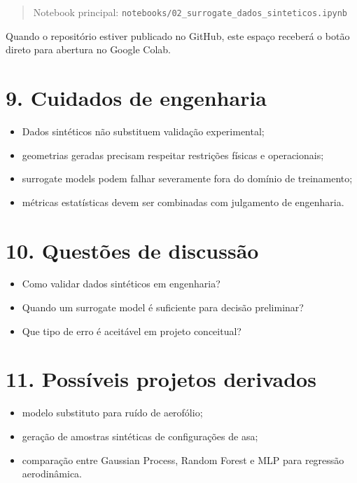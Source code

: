 \documentclass[
  brazilian,
  a4paper,
  DIV=11,
  numbers=noendperiod]{scrreprt}
\providecommand{\tightlist}{%
  \setlength{\itemsep}{0pt}\setlength{\parskip}{0pt}}
\begin{document}
\begin{quote}
Notebook principal:
\texttt{notebooks/02\_surrogate\_dados\_sinteticos.ipynb}
\end{quote}

Quando o repositório estiver publicado no GitHub, este espaço receberá o
botão direto para abertura no Google Colab.

\section{9. Cuidados de engenharia}\label{cuidados-de-engenharia-1}

\begin{itemize}
\tightlist
\item
  Dados sintéticos não substituem validação experimental;
\item
  geometrias geradas precisam respeitar restrições físicas e
  operacionais;
\item
  surrogate models podem falhar severamente fora do domínio de
  treinamento;
\item
  métricas estatísticas devem ser combinadas com julgamento de
  engenharia.
\end{itemize}

\section{10. Questões de discussão}\label{questuxf5es-de-discussuxe3o-1}

\begin{itemize}
\tightlist
\item
  Como validar dados sintéticos em engenharia?
\item
  Quando um surrogate model é suficiente para decisão preliminar?
\item
  Que tipo de erro é aceitável em projeto conceitual?
\end{itemize}

\section{11. Possíveis projetos
derivados}\label{possuxedveis-projetos-derivados-1}

\begin{itemize}
\tightlist
\item
  modelo substituto para ruído de aerofólio;
\item
  geração de amostras sintéticas de configurações de asa;
\item
  comparação entre Gaussian Process, Random Forest e MLP para regressão
  aerodinâmica.
\end{itemize}
\end{document}
